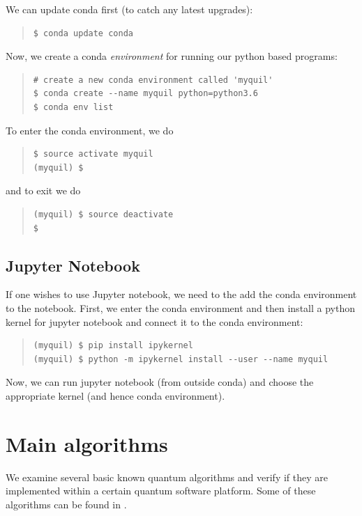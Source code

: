 \documentclass[a4paper,10pt]{article}
\begin{document}
We can update conda first (to catch any latest upgrades):
\begin{quote}
\begin{verbatim}
$ conda update conda
\end{verbatim}
\end{quote}

Now, we create a conda {\em environment} for running our python based programs:
\begin{quote}
\begin{verbatim}
# create a new conda environment called 'myquil'
$ conda create --name myquil python=python3.6
$ conda env list
\end{verbatim}
\end{quote}
To enter the conda environment, we do
\begin{quote}
\begin{verbatim} 
$ source activate myquil
(myquil) $
\end{verbatim}
\end{quote}
and to exit we do
\begin{quote}
\begin{verbatim} 
(myquil) $ source deactivate
$
\end{verbatim}
\end{quote}

\subsection{Jupyter Notebook}

If one wishes to use Jupyter notebook, we need to the add the conda environment
to the notebook. First, we enter the conda environment and then install a python kernel 
for jupyter notebook and connect it to the conda environment:
\begin{quote}
\begin{verbatim} 
(myquil) $ pip install ipykernel
(myquil) $ python -m ipykernel install --user --name myquil
\end{verbatim}
\end{quote}
Now, we can run jupyter notebook (from outside conda) and choose the appropriate 
kernel (and hence conda environment).


\section{Main algorithms}

We examine several basic known quantum algorithms and verify if they are implemented 
within a certain quantum software platform.
Some of these algorithms can be found in \textcite{NC00}.
\end{document}
